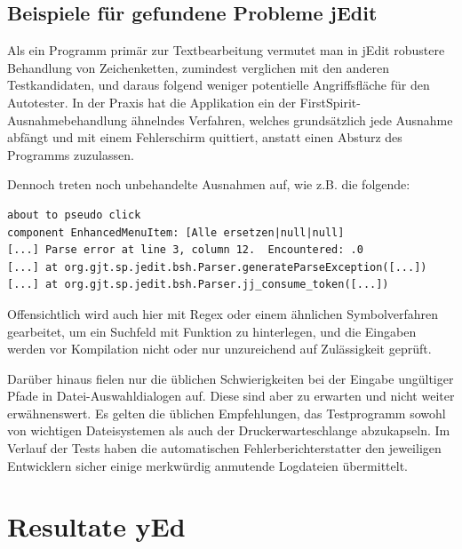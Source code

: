 \subsection{Beispiele für gefundene Probleme jEdit}

Als ein Programm primär zur Textbearbeitung vermutet man in jEdit 
robustere Behandlung von Zeichenketten,
zumindest verglichen mit den anderen Testkandidaten, und daraus
folgend weniger potentielle Angriffsfläche für den Autotester. In der Praxis
hat die Applikation ein der FirstSpirit-Ausnahmebehandlung ähnelndes
Verfahren, welches grundsätzlich jede Ausnahme abfängt und mit einem
Fehlerschirm quittiert, anstatt einen Absturz des Programms zuzulassen.

Dennoch treten noch unbehandelte Ausnahmen auf, wie z.B. die
folgende:

\begin{lstlisting}[float=!ht,label=fmjson,caption={Ausnahme bei Texteingabe}]
about to pseudo click 
component EnhancedMenuItem: [Alle ersetzen|null|null]
[...] Parse error at line 3, column 12.  Encountered: .0
[...] at org.gjt.sp.jedit.bsh.Parser.generateParseException([...])
[...] at org.gjt.sp.jedit.bsh.Parser.jj_consume_token([...])
\end{lstlisting}

Offensichtlich wird auch hier mit Regex oder einem ähnlichen
Symbolverfahren gearbeitet, um ein Suchfeld mit Funktion zu hinterlegen,
und die Eingaben werden vor Kompilation nicht oder nur unzureichend 
auf Zulässigkeit geprüft.

Darüber hinaus fielen nur die üblichen Schwierigkeiten bei der Eingabe
ungültiger Pfade in Datei-Auswahldialogen auf. Diese sind aber zu erwarten
und nicht weiter erwähnenswert. Es gelten die üblichen Empfehlungen,
das Testprogramm sowohl von wichtigen Dateisystemen als auch
der Druckerwarteschlange abzukapseln. Im Verlauf der Tests haben die
automatischen Fehlerberichterstatter den jeweiligen Entwicklern sicher
einige merkwürdig anmutende Logdateien übermittelt.




\section{Resultate yEd}\label{section:testresultsyed}

